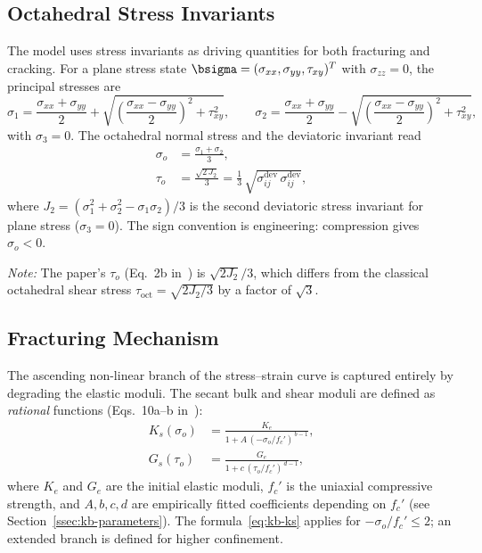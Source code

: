 \subsection{Octahedral Stress Invariants}
\label{ssec:kb-octahedral}

The model uses stress invariants as driving quantities for both
fracturing and cracking.  For a plane stress state
$\bsigma = (\sigma_{xx}, \sigma_{yy}, \tau_{xy})^T$ with $\sigma_{zz} = 0$,
the principal stresses are
\[
  \sigma_1 = \frac{\sigma_{xx}+\sigma_{yy}}{2}
           + \sqrt{\left(\frac{\sigma_{xx}-\sigma_{yy}}{2}\right)^2 + \tau_{xy}^2},
  \qquad
  \sigma_2 = \frac{\sigma_{xx}+\sigma_{yy}}{2}
           - \sqrt{\left(\frac{\sigma_{xx}-\sigma_{yy}}{2}\right)^2 + \tau_{xy}^2},
\]
with $\sigma_3 = 0$.  The octahedral normal stress and the deviatoric invariant read
\begin{align}
  \sigma_o &= \frac{\sigma_1 + \sigma_2}{3},
  \label{eq:kb-sigma-o}
  \\[4pt]
  \tau_o   &= \frac{\sqrt{2\,J_2}}{3}
             = \frac{1}{3}\,\sqrt{\sigma_{ij}^{\text{dev}}\,\sigma_{ij}^{\text{dev}}},
  \label{eq:kb-tau-o}
\end{align}
where $J_2 = (\sigma_1^2 + \sigma_2^2 - \sigma_1\sigma_2)/3$ is the second
deviatoric stress invariant for plane stress ($\sigma_3 = 0$).
The sign convention is engineering: compression gives $\sigma_o < 0$.

\emph{Note:} The paper's $\tau_o$ (Eq.~2b in~\cite{KoBathe2026}) is
$\sqrt{2J_2}/3$, which differs from the classical octahedral shear stress
$\tau_{\text{oct}} = \sqrt{2J_2/3}$ by a factor of $\sqrt{3}$.

\subsection{Fracturing Mechanism}
\label{ssec:kb-fracturing}

The ascending non-linear branch of the stress--strain curve is captured
entirely by degrading the elastic moduli.  The secant bulk and shear moduli
are defined as \emph{rational} functions (Eqs.~10a--b in~\cite{KoBathe2026}):
\begin{align}
  K_s(\sigma_o) &= \frac{K_e}{1 + A\,(-\sigma_o/f_c')^{\,b-1}},
  \label{eq:kb-ks}
  \\[4pt]
  G_s(\tau_o)   &= \frac{G_e}{1 + c\,(\tau_o/f_c')^{\,d-1}},
  \label{eq:kb-gs}
\end{align}
where $K_e$ and $G_e$ are the initial elastic moduli, $f_c'$ is the
uniaxial compressive strength, and $A, b, c, d$ are empirically fitted
coefficients depending on $f_c'$ (see Section~\ref{ssec:kb-parameters}).
The formula~\eqref{eq:kb-ks} applies for $-\sigma_o/f_c' \le 2$; an
extended branch is defined for higher confinement.

